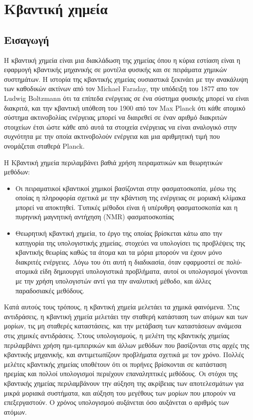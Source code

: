 \section{Κβαντική χημεία}
\subsection{Εισαγωγή}
Η κβαντική χημεία είναι μια διακλάδωση της χημείας όπου η κύρια εστίαση είναι η εφαρμογή κβαντικής μηχανικής σε μοντέλα φυσικής και σε πειράματα  χημικών συστημάτων.
Η ιστορία της κβαντικής χημείας ουσιαστικά ξεκινάει με την ανακάλυψη των καθοδικών ακτίνων από τον Michael Faraday, την υπόδειξη του 1877 απο τον Ludwig Boltzmann ότι τα επίπεδα ενέργειας σε ένα σύστημα φυσικής μπορεί να είναι διακριτά, και την κβαντική υπόθεση του 1900 από τον Max Planck ότι κάθε ατομικό σύστημα ακτινοβολίας ενέργειας μπορεί να διαιρεθεί σε έναν αριθμό διακριτών στοιχείων έτσι ώστε κάθε από αυτά τα στοιχεία ενέργειας να είναι αναλογικό στην συχνότητα με την οποία ακτινοβολούν ενέργεια και μια αριθμητική τιμή που ονομάζεται σταθερά Planck.

Η Κβαντική χημεία περιλαμβάνει βαθιά χρήση πειραματικών και θεωρητικών μεθόδων:
\begin{itemize}
\item Οι πειραματικοί κβαντικοί χημικοί βασίζονται στην φασματοσκοπία, μέσω της οποίας η πληροφορία σχετικά με την κβάντιση της ενέργειας σε μοριακή κλίμακα μπορεί να αποκτηθεί. Τυπικές μέθοδοι είναι ή υπέρυθρη φασματοσκοπία και η πυρηνική μαγνητική αντήχηση (NMR) φασματοσκοπίας
\item Θεωρητική κβαντική χημεία, το έργο της οποίας βρίσκεται κάτω απο την κατηγορία της υπολογιστικής χημείας, στοχεύει να υπολογίσει τις προβλέψεις της κβαντικής θεωρίας καθώς τα άτομα και τα μόρια μπορούν να έχουν μόνο διακριτές ενέργειες. Λόγω του ότι αυτή η διαδικασία, όταν εφαρμοστεί σε πολύ-ατομικά είδη δημιουργεί υπολογιστικά προβλήματα, αυτοί οι υπολογισμοί γίνονται με την χρήση υπολογιστών αντί για την αναλυτική μέθοδο, και άλλες παραδοσιακές μεθόδους.
\end{itemize}
Κατά αυτούς τους τρόπους, η κβαντική χημεία μελετάει τα χημικά φαινόμενα. Στις αντιδράσεις, η κβαντική χημεία μελετάει την σταθερή κατάσταση των ατόμων και των μορίων, τις μη σταθερές καταστάσεις, και την μετάβαση των καταστάσεων ανάμεσα στις χημικές αντιδράσεις. Στους υπολογισμούς, η μελέτη της κβαντικής χημείας περιλαμβάνει χρήση ημι-εμπειρικών και άλλων μεθόδων που βασίζονται στις αρχές της κβαντικής μηχανικής, και αντιμετωπίζουν προβλήματα σχετικά με τον χρόνο. Πολλές μελέτες κβαντικής χημείας υποθέτουν ότι οι πυρήνες βρίσκονται σε κατάσταση ηρεμίας και πολλοί υπολογισμοί περιέχουν επαναληπτικές μεθόδους. Οι στόχοι της κβαντικής χημείας περιλαμβάνουν την αύξηση της ακρίβειας των αποτελεσμάτων για μικρά μοριακά συστήματα, και αύξηση του μεγέθους των μορίων που μπορούν να επεξεργαστούν. Ο χρόνος υπολογισμού αυξάνεται όσο αυξάνεται ο αριθμός των ατόμων.


